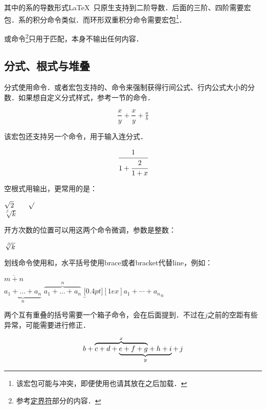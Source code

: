 其中的系的导数形式\LaTeX\ 只原生支持到二阶导数．后面的三阶、四阶需要宏包．系的积分命令类似．而环形双重积分命令需要宏包\footnote{该宏包可能与冲突，即便使用也请其放在之后加载．}．

或命令\footnote{参考\hyperref[subsec:delimiter]{定界符}部分的内容．}只用于匹配，本身不输出任何内容．

\subsection{分式、根式与堆叠}
分式使用命令．或者宏包支持的、命令来强制获得行间公式、行内公式大小的分数．如果想自定义分式样式，参考一节的命令．
\begin{codeshow}
\[\frac{x}{y}+\dfrac{x}{y}
+\tfrac{a}{b}\]
\end{codeshow}

该宏包还支持另一个命令，用于输入连分式．
\begin{codeshow}
\[\cfrac{1}{1+\cfrac{2}{1+x}}\]
\end{codeshow}

空根式用输出，更常用的是：
\begin{codeshow}
$\sqrt{2} \qquad \surd$\\
$\sqrt[\beta]{k}$
\end{codeshow}

开方次数的位置可以用这两个命令微调，参数是整数：
\begin{codeshow}
$\sqrt[\leftroot{-2}\uproot{2} \beta]{k}$
\end{codeshow}

划线命令使用和，水平括号使用brace或者bracket代替line，例如：

\begin{codeshow}
$\overline{m+n}$ \\
$\underbrace{a_1+\ldots+a_n}_{n}$
$\overbrace{a_1+\ldots+a_n}^{n}$
$\underbracket[0.4pt][1ex]
  {a_1+\cdots+a_n}_n$
\end{codeshow}

两个互有重叠的括号需要一个箱子命令，会在后面提到．不过在$j$之前的空距有些异常，可能需要\latexline{,}进行修正．
\begin{codeshow}
\[b+\rlap{$\overbrace{\phantom{
  c+d+e+f+g}}^x$}c+d+\underbrace{
  e+f+g+h+i}_y+\,j \]
\end{codeshow}

